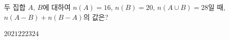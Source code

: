 두 집합 $A$, $B$에 대하여 $n(A)=16$, $n(B)=20$, $n(A\cup B)=28$일 때, $n(A-B)+n(B-A)$의 값은?
\begin{choices32}{$20$}{$21$}{$22$}{$23$}{$24$}\end{choices32}
